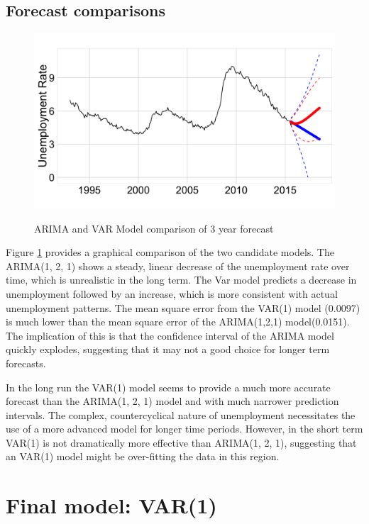 \documentclass[twoside,twocolumn]{article}
\begin{document}
 \subsection{Forecast comparisons}
    \begin{figure}[htb]
    	\centering
     	\caption{ARIMA and VAR Model comparison of 3 year  forecast}
     	\includegraphics[width=\linewidth]{images/arimavarforecast}
     	\label{fig:arimavarforecast}
 \end{figure}


      Figure \ref{fig:arimavarforecast} provides a graphical comparison of the two candidate models.  The ARIMA(1, 2, 1) shows a steady, linear decrease of the unemployment rate over time, which is unrealistic in the long term.  The Var model predicts a decrease in unemployment followed by an increase, which is more consistent with actual unemployment patterns. The mean square error from the VAR(1) model (0.0097) is much lower than the mean square error of the ARIMA(1,2,1) model(0.0151). The implication of this is that  the confidence interval of the ARIMA model quickly explodes, suggesting that it may not a good choice for longer term forecasts.

In the long run the VAR(1) model seems to provide a much more accurate forecast than the ARIMA(1, 2, 1) model and with much narrower prediction intervals. The complex, countercyclical nature of unemployment necessitates the use of a more advanced model for longer time periods. However, in the short term VAR(1) is not dramatically more effective than ARIMA(1, 2, 1), suggesting that an VAR(1) model might be over-fitting the data in this region.


 \section{Final model: VAR(1)}
\end{document}

